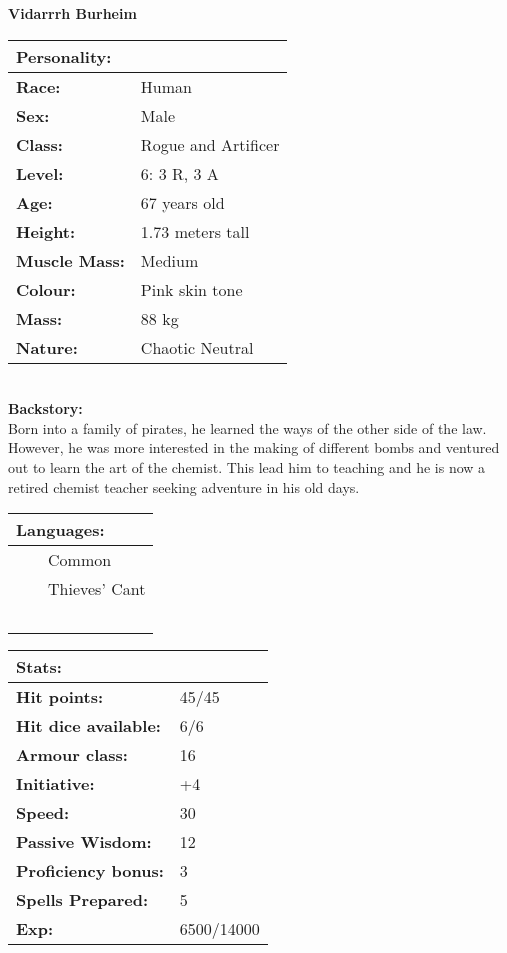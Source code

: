 \documentclass[11pt]{article}
\newcommand{\tabitem}{~~\llap{--}~~}
\begin{document}
	\begin{center}
\Huge \textbf{Vidarrrh Burheim}
	\end{center}
	\begin{multicols}{2}
\noindent \begin{tabularx}{95mm}{@{}l l}
\Large \textbf{Personality:} 	& 						\\
\hline
\textbf{Race:} 					& Human	 				\\
\textbf{Sex:} 					& Male 					\\
\textbf{Class:}					& Rogue and Artificer	\\
\textbf{Level:} 				& 6: 3 R, 3 A			\\
\textbf{Age:} 					& 67 years old			\\
\textbf{Height:} 				& 1.73 meters tall 		\\
\textbf{Muscle Mass:} 			& Medium 				\\
\textbf{Colour:} 				& Pink skin tone	 	\\
\textbf{Mass:} 					& 88 kg			 		\\
\textbf{Nature:} 				& Chaotic Neutral
		\end{tabularx} \\
\textbf{Backstory:} \\
Born into a family of pirates, he learned the ways of the other side of the law. However, he was more interested in the making of different bombs and ventured out to learn the art of the chemist. This lead him to teaching and he is now a retired chemist teacher seeking adventure in his old days.

\noindent \begin{tabularx}{95mm}{@{}l}
{\Large \textbf{Languages:}} \\
\hline
\tabitem Common \\
\tabitem Thieves' Cant \\
\tabitem 
		\end{tabularx}

\vspace{4mm}

\noindent \begin{tabularx}{95mm}{@{}l l}
\Large \textbf{Stats:}		 	& 									\\
\hline
\textbf{Hit points:} 			& 45/45 							\\
\textbf{Hit dice available:}	& 6/6								\\
\textbf{Armour class:} 			& 16							 	\\
\textbf{Initiative:} 			& +4								\\
\textbf{Speed:} 				& 30		 						\\
\textbf{Passive Wisdom:} 		& 12	 							\\
\textbf{Proficiency bonus:}		& 3									\\
\textbf{Spells Prepared:} 		& 5									\\
\textbf{Exp:} 					& 6500/14000
		\end{tabularx}


\end{multicols}
\end{document}
